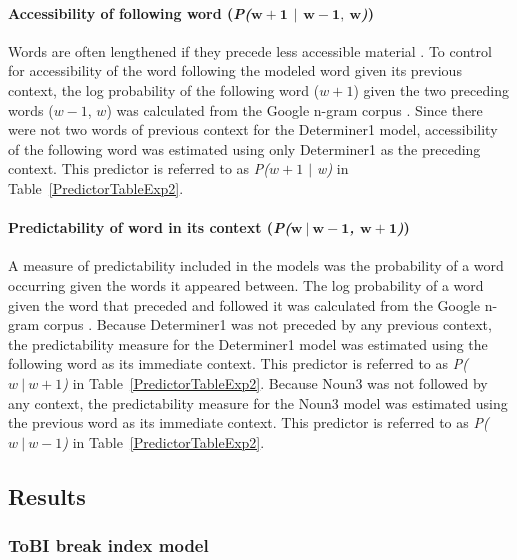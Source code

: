 \documentclass[12pt,titlepage]{article}
\newcommand{\IGNORE}[1]{} %
\begin{document}
\paragraph{Accessibility of following word (\textit{P($\mathbf{w + 1}$ $\mathbf|$ $\mathbf{w - 1,~ w}$)})} Words are often lengthened if they precede less accessible material \cite{FoxTreeClark97}. To control for accessibility of the word following the modeled word given its previous context, the log probability of the following word ($w + 1$) given the two preceding words ($w - 1$, $w$) was calculated from the Google n-gram corpus \cite{GoogleNgram}. \IGNORE{This predictor is referred to as \textit{P($w + 1$ $|$ $w - 1,~ w$)} in Table~\ref{PredictorTableExp2}. } Since there were not two words of previous context for the Determiner1 model, accessibility of the following word was estimated using only Determiner1 as the preceding context. This predictor is referred to as \textit{P($w + 1$ $|$ w)} in Table~\ref{PredictorTableExp2}.

\paragraph{Predictability of word in its context (\textit{P($\mathbf{w~|~w - 1}$, $\mathbf{w + 1}$)})} A measure of predictability included in the models was the probability of a word occurring given the words it appeared between. The log probability of a word given the word that preceded and followed it was calculated from the Google n-gram corpus \cite{GoogleNgram}. \IGNORE{ This predictor is referred to as \textit{P($w~|~w - 1$, $w + 1$)} in Table~\ref{PredictorTableExp2}. }Because Determiner1 was not preceded by any previous context, the predictability measure for the Determiner1 model was estimated using the following word as its immediate context. This predictor is referred to as \textit{P($w~|~w +1$)} in Table~\ref{PredictorTableExp2}. Because Noun3 was not followed by any context, the predictability measure for the Noun3 model was estimated using the previous word as its immediate context. This predictor is referred to as \textit{P($w~|~w - 1$)} in Table~\ref{PredictorTableExp2}.


\subsection{Results}

 
\subsubsection{ToBI break index model}
\end{document}
